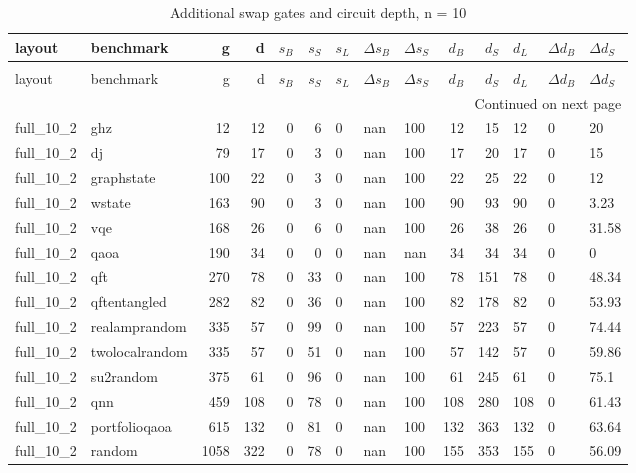 \begin{longtable}{llrrrrlllrrlll}
\caption{Additional swap gates and circuit depth, n = 10} \label{benchmark-table-10} \\
\toprule
layout & benchmark & g & d & $s_B$ & $s_S$ & $s_L$ & $\Delta s_B$ & $\Delta s_S$ & $d_B$ & $d_S$ & $d_L$ & $\Delta d_B$ & $\Delta d_S$ \\
\midrule
\endfirsthead
\caption[]{Additional swap gates and circuit depth, n = 10} \\
\toprule
layout & benchmark & g & d & $s_B$ & $s_S$ & $s_L$ & $\Delta s_B$ & $\Delta s_S$ & $d_B$ & $d_S$ & $d_L$ & $\Delta d_B$ & $\Delta d_S$ \\
\midrule
\endhead
\midrule
\multicolumn{14}{r}{Continued on next page} \\
\midrule
\endfoot
\bottomrule
\endlastfoot
full\_10\_2 & ghz & 12 & 12 & 0 & 6 & 0 & nan & 100 & 12 & 15 & 12 & 0 & 20 \\
full\_10\_2 & dj & 79 & 17 & 0 & 3 & 0 & nan & 100 & 17 & 20 & 17 & 0 & 15 \\
full\_10\_2 & graphstate & 100 & 22 & 0 & 3 & 0 & nan & 100 & 22 & 25 & 22 & 0 & 12 \\
full\_10\_2 & wstate & 163 & 90 & 0 & 3 & 0 & nan & 100 & 90 & 93 & 90 & 0 & 3.23 \\
full\_10\_2 & vqe & 168 & 26 & 0 & 6 & 0 & nan & 100 & 26 & 38 & 26 & 0 & 31.58 \\
full\_10\_2 & qaoa & 190 & 34 & 0 & 0 & 0 & nan & nan & 34 & 34 & 34 & 0 & 0 \\
full\_10\_2 & qft & 270 & 78 & 0 & 33 & 0 & nan & 100 & 78 & 151 & 78 & 0 & 48.34 \\
full\_10\_2 & qftentangled & 282 & 82 & 0 & 36 & 0 & nan & 100 & 82 & 178 & 82 & 0 & 53.93 \\
full\_10\_2 & realamprandom & 335 & 57 & 0 & 99 & 0 & nan & 100 & 57 & 223 & 57 & 0 & 74.44 \\
full\_10\_2 & twolocalrandom & 335 & 57 & 0 & 51 & 0 & nan & 100 & 57 & 142 & 57 & 0 & 59.86 \\
full\_10\_2 & su2random & 375 & 61 & 0 & 96 & 0 & nan & 100 & 61 & 245 & 61 & 0 & 75.1 \\
full\_10\_2 & qnn & 459 & 108 & 0 & 78 & 0 & nan & 100 & 108 & 280 & 108 & 0 & 61.43 \\
full\_10\_2 & portfolioqaoa & 615 & 132 & 0 & 81 & 0 & nan & 100 & 132 & 363 & 132 & 0 & 63.64 \\
full\_10\_2 & random & 1058 & 322 & 0 & 78 & 0 & nan & 100 & 155 & 353 & 155 & 0 & 56.09 \\

\end{longtable}
